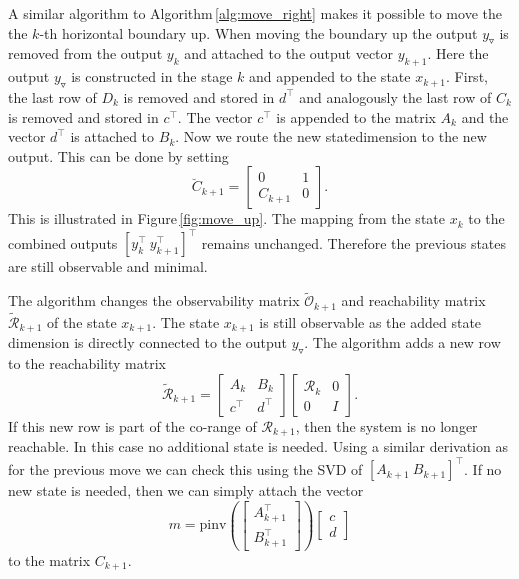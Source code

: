 \documentclass[doctype=mastersthesis,BCOR=15mm,biblatex]{ldvbook}%
\newcommand{\R}{\mathcal{R}} %
\newcommand{\Ob}{\mathcal{O}} %
\newcommand{\eye}{I} %
\newcommand{\m}{\triangledown} %
\begin{document}
A similar algorithm to Algorithm\,\ref{alg:move_right} makes it possible to move the the $k$-th horizontal boundary up.
When moving the boundary up the output $y_\m$ is removed from the output $y_k$ and attached to the output vector $y_{k+1}$.
Here the output $y_\m$ is constructed in the stage $k$ and appended to the state $x_{k+1}$.
First, the last row of $D_{k}$ is removed and stored in $d^\top$ and analogously the last row of $C_k$ is removed and stored in $c^\top$.
The vector $c^\top$ is appended to the matrix $A_k$ and the vector $d^\top$ is attached to $B_k$.
Now we route the new statedimension to the new output.
This can be done by setting 
\begin{equation}
\breve{C}_{k+1} = 
\begin{bmatrix}
0 & 1\\ C_{k+1} & 0
\end{bmatrix}
.
\end{equation}
This is illustrated in Figure\,\ref{fig:move_up}.
The mapping from the state $x_k$ to the combined outputs $[y_k^\top \: y_{k+1}^\top]^\top$ remains unchanged. Therefore the previous states are still observable and minimal.

The algorithm changes the observability matrix $\tilde{\Ob}_{k+1}$ and reachability matrix $\tilde{\R}_{k+1}$ of the state $x_{k+1}$.
The state $x_{k+1}$ is still observable as the added state dimension is directly connected to the output $y_\m$.
The algorithm adds a new row to the reachability matrix
\begin{equation}
\tilde{\R}_{k+1}
=
\begin{bmatrix}
A_{k} & B_{k}\\
c^\top & d^\top
\end{bmatrix}
\begin{bmatrix}
\R_{k} &0\\
0& \eye
\end{bmatrix}
.
\end{equation}
If this new row is part of the co-range of $\R_{k+1}$, then the system is no longer reachable.
In this case no additional state is needed. 
Using a similar derivation as for the previous move we can check this using the SVD of $[A_{k+1} \: B_{k+1}]^\top$.
If no new state is needed, then we can simply attach the vector
\begin{equation}
m = \text{pinv}\left(\begin{bmatrix}
A_{k+1}^\top\\B_{k+1}^\top
\end{bmatrix}\right) 
\begin{bmatrix}
c \\ d
\end{bmatrix}
\end{equation}
to the matrix $C_{k+1}$.
\end{document}
